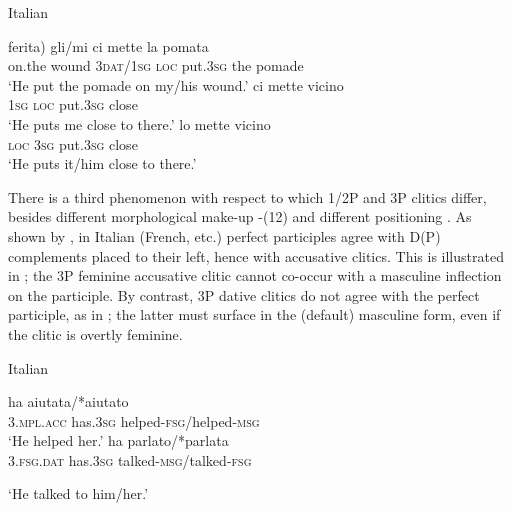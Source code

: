 \documentclass[output=paper]{langscibook}
\begin{document}
\ea\label{ex:manzini:}
Italian\\
\begin{xlist}
\ex {} {ferita)}   {gli/mi}    {ci}   {mette} {la} {pomata}\\
on.the wound   \textsc{3dat/1sg}   \textsc{loc}   put.\textsc{3sg} the pomade\\
\glt ‘He put the pomade on my/his wound.’
\ex {}  {ci}   {mette}   {vicino}\\
\textsc{1sg}  \textsc{loc}  put.\textsc{3sg} close\\
\glt ‘He puts me close to there.’
\ex {}  {lo}  {mette}   {vicino}\\
\textsc{loc}  \textsc{3sg}   put.\textsc{3sg} close\\
\glt ‘He puts it/him close to there.’
\end{xlist}
\z

There is a third phenomenon with respect to which 1/2P and 3P clitics differ, besides different morphological make-up -(12) and different positioning . As shown by \citet{Kayne1989}, in Italian (French, etc.) perfect participles agree with D(P) complements placed to their left, hence with accusative clitics. This is illustrated in ; the 3P feminine accusative clitic cannot co-occur with a masculine inflection on the participle. By contrast, 3P dative clitics do not agree with the perfect participle, as in ; the latter must surface in the (default) masculine form, even if the clitic is overtly feminine.

\ea\label{ex:manzini:}
Italian\\
\begin{xlist}
\ex {}     {ha}     {aiutata/*aiutato}\\
\textsc{3.mpl.acc}  has.\textsc{3sg}    helped-\textsc{fsg/}helped\textsc{{}-msg}\\
\glt ‘He helped her.’
       {ha}     {parlato/*parlata}\\

  \textsc{3.fsg.dat}  has.\textsc{3sg}    talked-\textsc{msg/}talked\textsc{{}-fsg}

  ‘He talked to him/her.’  
\end{xlist}
\z
 
\end{document}

